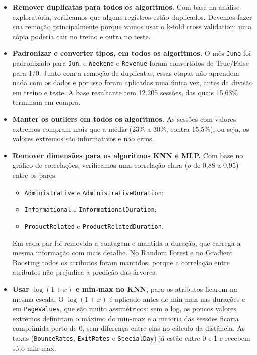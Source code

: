 \documentclass[11pt,a4paper]{article}
\DeclareRobustCommand{\atr}[1]{{\renewcommand{\_}{\textunderscore\allowbreak}\texttt{#1}}}
\begin{document}
\begin{itemize}
  \item \textbf{Remover duplicatas para todos os algoritmos.} Com base na análise exploratória, verificamos que
        alguns registros estão duplicados. Devemos fazer sua remoção principalmente porque vamos usar o k-fold cross
        validation: uma cópia poderia cair no treino e outra no teste.
  \item \textbf{Padronizar e converter tipos, em todos os algoritmos.} O mês \atr{June} foi padronizado para
        \atr{Jun}, e \atr{Weekend} e \atr{Revenue} foram convertidos de True/False para 1/0. Junto com a remoção de
        duplicatas, essas etapas não aprendem nada com os dados e por isso foram aplicadas uma única vez, antes da
        divisão em treino e teste. A base resultante tem 12.205 sessões, das quais 15,63\% terminam em compra.
  \item \textbf{Manter os outliers em todos os algoritmos.} As sessões com valores extremos compram mais que a média
        (23\% a 30\%, contra 15,5\%), ou seja, os valores extremos são informativos e não erros.
  \item \textbf{Remover dimensões para os algoritmos KNN e MLP.} Com base no gráfico de correlações, verificamos uma
        correlação clara ($\rho$ de 0,88 a 0,95) entre os pares:
        \begin{itemize}
          \item \atr{Administrative} e \atr{Administrative\_Duration};
          \item \atr{Informational} e \atr{Informational\_Duration};
          \item \atr{ProductRelated} e \atr{ProductRelated\_Duration}.
        \end{itemize}
        Em cada par foi removida a contagem e mantida a duração, que carrega a mesma informação com mais
        detalhe. No Random Forest e no Gradient Boosting todos os atributos foram mantidos, porque a correlação entre
        atributos não prejudica a predição das árvores.
  \item \textbf{Usar $\log(1+x)$ e min-max no KNN}, para os atributos ficarem na mesma escala. O $\log(1+x)$ é
        aplicado antes do min-max nas durações e em \atr{PageValues}, que são muito assimétricos: sem o log, os
        poucos valores extremos definiriam o máximo do min-max e a maioria das sessões ficaria comprimida perto de 0,
        sem diferença entre elas no cálculo da distância. As taxas (\atr{BounceRates}, \atr{ExitRates} e
        \atr{SpecialDay}) já estão entre 0 e 1 e recebem só o min-max.

\end{itemize}
\end{document}
